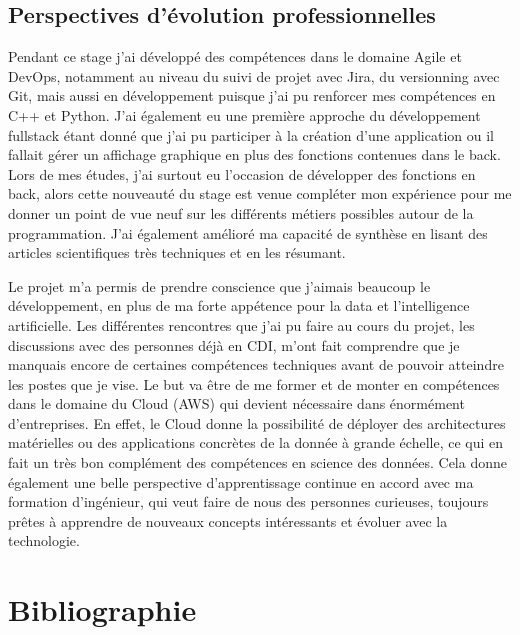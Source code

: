 \documentclass[11pt]{article}
\begin{document}
    \subsection{Perspectives d'évolution professionnelles}

      Pendant ce stage j'ai développé des compétences dans le domaine Agile et DevOps, notamment au niveau du 
      suivi de projet avec Jira, du versionning avec Git, mais aussi en développement puisque j'ai pu renforcer 
      mes compétences en C++ et Python. J'ai également eu une première approche du développement fullstack 
      étant donné que j'ai pu participer à la création d'une application ou il fallait gérer un affichage 
      graphique en plus des fonctions contenues dans le back. Lors de mes études, j'ai surtout eu l'occasion de 
      développer des fonctions en back, alors cette nouveauté du stage est venue compléter mon expérience pour me 
      donner un point de vue neuf sur les différents métiers possibles autour de la programmation.
      J'ai également amélioré ma capacité de synthèse en lisant des articles scientifiques très techniques et en 
      les résumant.

      Le projet m'a permis de prendre conscience que j'aimais beaucoup le développement, en plus de ma forte 
      appétence pour la data et l'intelligence artificielle. Les différentes rencontres que j'ai pu faire au 
      cours du projet, les discussions avec des personnes déjà en CDI, m'ont fait comprendre que je manquais
      encore de certaines compétences techniques avant de pouvoir atteindre les postes que je vise.
      Le but va être de me former et de monter en compétences dans le domaine du Cloud (AWS) qui devient nécessaire dans 
      énormément d'entreprises. En effet, le Cloud donne la possibilité de déployer des architectures matérielles ou
      des applications concrètes de la donnée à grande échelle, ce qui en fait un très bon complément des compétences en science des données.
      Cela donne également une belle perspective d'apprentissage continue en accord avec ma formation d'ingénieur, qui veut 
      faire de nous des personnes curieuses, toujours prêtes à apprendre de nouveaux concepts intéressants et évoluer avec la technologie.   

  \pagebreak
  
  \section{Bibliographie}
\end{document}

